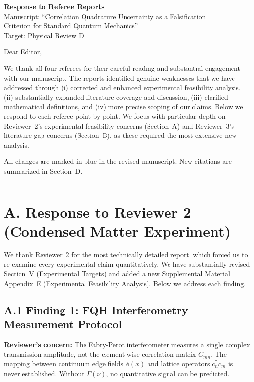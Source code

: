 \documentclass[11pt,a4paper]{article}
\begin{document}
\begin{center}
{\LARGE \textbf{Response to Referee Reports}}\\[1em]
{\large Manuscript: ``Correlation Quadrature Uncertainty as a Falsification\\[2pt]
Criterion for Standard Quantum Mechanics''}\\[0.5em]
{\large Target: Physical Review D}\\[2em]
\end{center}

\noindent Dear Editor,

We thank all four referees for their careful reading and substantial engagement with our manuscript. The reports identified genuine weaknesses that we have addressed through (i) corrected and enhanced experimental feasibility analysis, (ii) substantially expanded literature coverage and discussion, (iii) clarified mathematical definitions, and (iv) more precise scoping of our claims. Below we respond to each referee point by point. We focus with particular depth on Reviewer~2's experimental feasibility concerns (Section~A) and Reviewer~3's literature gap concerns (Section~B), as these required the most extensive new analysis.

All changes are marked in blue in the revised manuscript. New citations are summarized in Section~D.

\vspace{1em}
\hrule
\vspace{1em}

\section*{A. Response to Reviewer 2 (Condensed Matter Experiment)}

We thank Reviewer~2 for the most technically detailed report, which forced us to re-examine every experimental claim quantitatively. We have substantially revised Section~V (Experimental Targets) and added a new Supplemental Material Appendix~E (Experimental Feasibility Analysis). Below we address each finding.

\subsection*{A.1 Finding 1: FQH Interferometry Measurement Protocol}

\textbf{Reviewer's concern:} The Fabry-Perot interferometer measures a single complex transmission amplitude, not the element-wise correlation matrix $C_{mn}$. The mapping between continuum edge fields $\phi(x)$ and lattice operators $c^\dagger_n c_m$ is never established. Without $\Gamma(\nu)$, no quantitative signal can be predicted.
\end{document}
